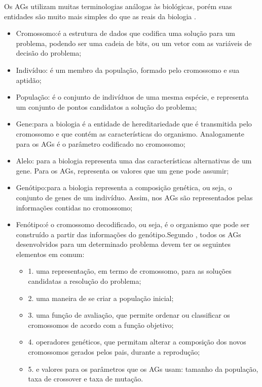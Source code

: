 Os AGs utilizam muitas terminologias análogas às biológicas, porém suas entidades são muito mais simples do que as reais da biologia \cite{goldberg02}.
\begin{itemize}
\item Cromossomo:é a estrutura de dados que codifica uma solução para um problema, podendo ser uma cadeia de bits, ou um vetor com as variáveis de decisão do problema;

\item Indivíduo: é um membro da população, formado pelo cromossomo e sua aptidão;

\item População: é o conjunto de indivíduos de uma mesma espécie, e representa um conjunto de pontos candidatos a solução do problema;

\item Gene:para a biologia é a entidade de hereditariedade que é transmitida pelo cromossomo e que contém as características do organismo. Analogamente para os AGs é o parâmetro codificado no cromossomo;

\item Alelo: para a biologia representa uma das características alternativas de um gene. Para os AGs, representa os valores que um gene pode assumir;

\item Genótipo:para a biologia representa a composição genética, ou seja, o conjunto de genes de um indivíduo. Assim, nos AGs são representados pelas informações contidas no cromossomo;

\item Fenótipo:é o cromossomo decodificado, ou seja, é o organismo que pode ser construído a partir das informações do genótipo.Segundo \cite{linden12}, todos os AGs desenvolvidos para um determinado problema devem ter os seguintes elementos em comum:
\begin{itemize}
	\item 1. uma representação, em termo de cromossomo, para as soluções candidatas a resolução do problema;
	\item 2. uma maneira de se criar a população inicial;
	\item 3. uma função de avaliação, que permite ordenar ou classificar os cromossomos de acordo com a função objetivo;
	\item 4. operadores genéticos, que permitam alterar a composição dos novos cromossomos gerados pelos pais, durante a reprodução;
	\item 5. e valores para os parâmetros que os AGs usam: tamanho da população, taxa de crossover e taxa de mutação.
\end{itemize}
\end{itemize}

